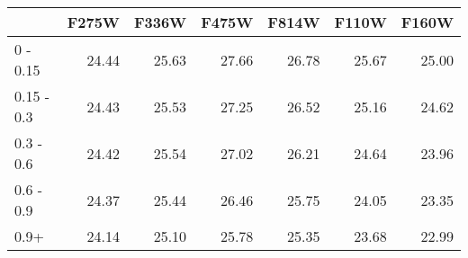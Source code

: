 \begin{tabular}{lrrrrrr}
\toprule
{} &  F275W &  F336W &  F475W &  F814W &  F110W &  F160W \\
\midrule
0 - 0.15   &  24.44 &  25.63 &  27.66 &  26.78 &  25.67 &  25.00 \\
0.15 - 0.3 &  24.43 &  25.53 &  27.25 &  26.52 &  25.16 &  24.62 \\
0.3 - 0.6  &  24.42 &  25.54 &  27.02 &  26.21 &  24.64 &  23.96 \\
0.6 - 0.9  &  24.37 &  25.44 &  26.46 &  25.75 &  24.05 &  23.35 \\
0.9+       &  24.14 &  25.10 &  25.78 &  25.35 &  23.68 &  22.99 \\
\bottomrule
\end{tabular}
